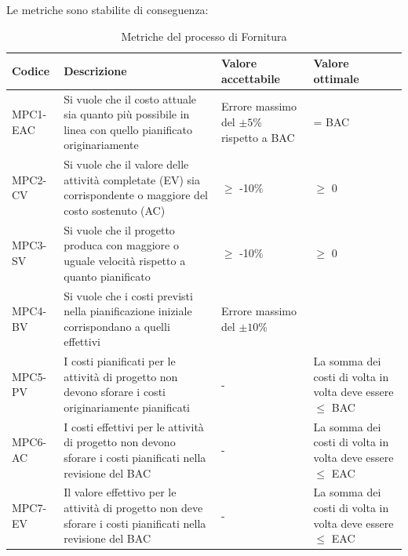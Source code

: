 \newpage
Le metriche sono stabilite di conseguenza:
\begin{table}[h!]
\centering
\def\arraystretch{1.5}
\begin{tabular}{ |>{\centering\arraybackslash}m{2.5cm}|>{\centering\arraybackslash}m{5.5cm}|>{\centering\arraybackslash}m{3cm}|>{\centering\arraybackslash}m{3cm}| }
\hline
\rowcolor{black}
\textbf{\color{white} Codice} & \textbf{\color{white} Descrizione} & \textbf{\color{white} Valore accettabile} & \textbf{\color{white} Valore ottimale}\\
\hline
MPC1-EAC & Si vuole che il costo attuale sia quanto più possibile in linea con quello pianificato originariamente & Errore massimo del $\pm 5$\% rispetto a BAC & = BAC \\
\hline
MPC2-CV & Si vuole che il valore delle attività completate (EV) sia corrispondente o maggiore del costo sostenuto (AC) & $\geq$ -10\% & $\geq$ 0 \\
\hline
MPC3-SV & Si vuole che il progetto produca con maggiore o uguale velocità rispetto a quanto pianificato & $\geq$ -10\% & $\geq$ 0 \\
\hline
MPC4-BV & Si vuole che i costi previsti nella pianificazione iniziale corrispondano a quelli effettivi & Errore massimo del $\pm 10$\% & 0 \\
\hline
MPC5-PV & I costi pianificati per le attività di progetto non devono sforare i costi originariamente pianificati & - & La somma dei costi di volta in volta deve essere $\leq$ BAC \\
\hline
MPC6-AC & I costi effettivi per le attività di progetto non devono sforare i costi pianificati nella revisione del BAC & - & La somma dei costi di volta in volta deve essere $\leq$ EAC \\
\hline
MPC7-EV & Il valore effettivo per le attività di progetto non deve sforare i costi pianificati nella revisione del BAC & - & La somma dei costi di volta in volta deve essere $\leq$ EAC \\
\hline
\end{tabular}
\caption{Metriche del processo di Fornitura}
\end{table}

